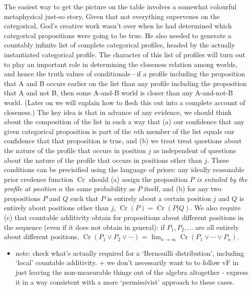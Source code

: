 \documentclass[leqno, 11pt, a5paper, openany]{article}
\DeclareMathOperator{\prior}{Cr}
\begin{document}
The easiest way to get the picture on the table involves a somewhat colourful metaphysical just-so story. Given that not everything supervenes on the categorical, God's creative work wasn't over when he had determined which categorical propositions were going to be true. He also needed to generate a countably infinite list of complete categorical profiles, headed by the actually instantiated categorical profile. The character of this list of profiles will turn out to play an important role in determining the closeness relation among worlds, and hence the truth values of conditionals---if a profile including the proposition that A and B occurs earlier on the list than any profile including the proposition that A and not B, then some A-and-B world is closer than any A-and-not-B world. (Later on we will explain how to flesh this out into a complete account of closeness.) The key idea is that in advance of any evidence, we should think about the composition of the list in such a way that (a) our confidence that any given categorical proposition is part of the $n$th member of the list equals our confidence that that proposition is true, and (b) we treat treat questions about the nature of the profile that occurs in position $j$ as independent of questions about the nature of the profile that occurs in positions other than $j$. These conditions can be precisified using the language of priors: any ideally reasonable prior credence function $\prior$ should (a) assign the proposition \emph{$P$ is entailed by the profile at position $n$} the same probability as $P$ itself, and (b) for any two propositions $P$ and $Q$ such that $P$ is entirely about a certain position $j$ and $Q$ is entirely about positions other than $j$, $\prior(P) = \prior(P|Q)$.  We also require (c) that countable additivity obtain for propositions about different positions in the sequence (even if it does not obtain in general): if $P_1, P_2, \ldots$ are all entirely about different positions, $\prior(P_1 ∨ P_2 ∨ \cdots)$ = $\lim_{n→∞}\prior(P_1 ∨ \cdots ∨ P_n)$.  

\begin{itemize}
\item
  note: check what's actually required for a ‘Bernouilli distribution’,
  including ‘local’ countable additivity. + we don't necessarily want to
  to follow vF in just leaving the non-measurable things out of the
  algebra altogether - express it in a way consistent with a more
  ‘permissivist’ approach to these cases.
\end{itemize}
\end{document}

